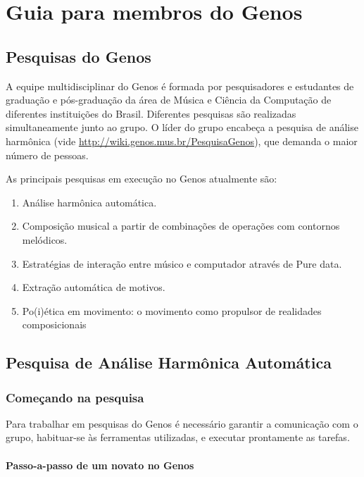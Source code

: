 \documentclass[12pt,brazil]{book}
\begin{document}
\part{Guia para membros do Genos}
\label{part:guia-para-membros}

\chapter{Pesquisas do Genos}
\label{cha:pesquisas-do-genos}

A equipe multidisciplinar do Genos é formada por pesquisadores e
estudantes de graduação e pós-graduação da área de Música e Ciência da
Computação de diferentes instituições do Brasil. Diferentes pesquisas
são realizadas simultaneamente junto ao grupo. O líder do grupo
encabeça a pesquisa de análise harmônica (vide
\url{http://wiki.genos.mus.br/PesquisaGenos}), que demanda o maior
número de pessoas.

As principais pesquisas em execução no Genos atualmente são:

\begin{enumerate}
\item Análise harmônica automática.
\item Composição musical a partir de combinações de operações com
  contornos melódicos.
\item Estratégias de interação entre músico e computador através de
  Pure data.
\item Extração automática de motivos.
\item Po(i)ética em movimento: o movimento como propulsor de
  realidades composicionais
\end{enumerate}

\chapter{Pesquisa de Análise Harmônica Automática}
\label{cha:anal-harm-autom}

\section{Começando na pesquisa}
\label{sec:comec-na-pesq}

Para trabalhar em pesquisas do Genos é necessário garantir a
comunicação com o grupo, habituar-se às ferramentas utilizadas, e
executar prontamente as tarefas.

\subsection{Passo-a-passo de um novato no Genos}
\label{sec:passo-passo-de}
\end{document}
